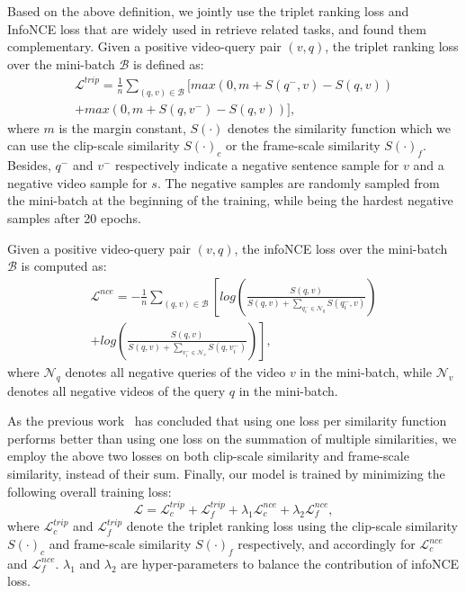 \documentclass[sigconf]{acmart}
\begin{document}
Based on the above definition, we jointly use the triplet ranking loss \cite{faghri2017vse++,dong2021dual} and InfoNCE loss \cite{miech2020end,zhang2021video} that are widely used in retrieve related tasks, and found them complementary. 
Given a positive video-query pair $(v, q)$, the triplet ranking loss over the mini-batch $\mathcal{B}$ is defined as:
\begin{equation}
\begin{split}
    \mathcal{L}^{trip}=\frac{1}{n}\sum_{(q,v) \in \mathcal{B}}[max(0,m+{S}(q^-, v)-{S}(q, v))\\
    +max(0,m+{S}(q, v^-)-{S}( q,v))],
\end{split}
\end{equation}
where $m$ is the margin constant, $S(\cdot)$ denotes the similarity function which we can use the clip-scale similarity $S(\cdot)_c$ or the frame-scale similarity $S(\cdot)_f$. Besides, $q^-$ and $v^-$ respectively indicate a negative sentence sample for $v$ and a negative video sample for $s$. The negative samples are randomly sampled from the mini-batch at the beginning of the training, while being the hardest negative samples after 20 epochs.

Given a positive video-query pair $(v, q)$, the infoNCE loss over the mini-batch $\mathcal{B}$ is computed as:
\begin{equation}
\begin{aligned}
    \mathcal{L}^{nce}=-\frac{1}{n}\sum_{(q,v) \in \mathcal{B}} \left[ 
     {log\left({\frac{{S}(q,v)}{{S}(q,v)+\sum_{q^-_i\in\mathcal{N}_q}{S}(q^-_i, v)}}\right)} \right. \\
    \left. +{log\left({\frac{{S}(q,v)}{{S}(q,v)+\sum_{v^-_i\in\mathcal{N}_v}{S}(q, v^-_i)}}\right)} 
    \right],
\end{aligned}
\end{equation}
where $\mathcal{N}_q$ denotes all negative queries of the video $v$ in the mini-batch, while $\mathcal{N}_v$ denotes all negative videos of the query $q$ in the mini-batch.

As the previous work~\cite{li2020sea} has concluded that using one loss per similarity function performs better than using one loss on the summation of multiple similarities, we employ the above two losses on both clip-scale similarity and frame-scale similarity, instead of their sum.
Finally, our model is trained by minimizing the following overall training loss:
\begin{equation}
    \mathcal{L}=\mathcal{L}^{trip}_c+ \mathcal{L}^{trip}_f+\lambda_{1}\mathcal{L}^{nce}_{c}+\lambda_{2}\mathcal{L}^{nce}_{f},
\end{equation}
where $\mathcal{L}^{trip}_c$ and $\mathcal{L}^{trip}_f$ denote the triplet ranking loss using the clip-scale similarity $S(\cdot)_c$ and frame-scale similarity $S(\cdot)_f$ respectively, and accordingly for $\mathcal{L}^{nce}_{c}$ and $\mathcal{L}^{nce}_{f}$. $\lambda_{1}$ and $\lambda_{2}$ are hyper-parameters to balance the contribution of infoNCE loss.
\end{document}
